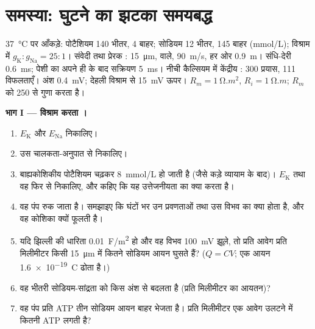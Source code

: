 \section{समस्या: घुटने का झटका समयबद्ध}

\begin{problem}
\label{pb:b2:neurons-synapses:1}
\qty{37}{\celsius} पर आँकड़े: पोटैशियम 140 भीतर, 4 बाहर; सोडियम 12 भीतर,
145 बाहर (\unit{mmol/L}); विश्राम में $g_{\mathrm K} : g_{\mathrm{Na}} = 25 : 1$।
संवेदी तथा प्रेरक : \qty{15}{\micro m},  वाले,
\qty{90}{m/s}, हर ओर \qty{0.9}{m}। संधि-देरी \qty{0.6}{ms};
पेशी का अपने ही  के बाद सक्रियण \qty{5}{ms}।
नीची कैल्सियम में केंद्रीय : 300 प्रयास, 111 विफलताएँ। अंश
\qty{0.4}{mV}; देहली विश्राम से \qty{15}{mV} ऊपर। $R_m =
\qty{1}{\ohm.m^2}$, $R_i = \qty{1}{\ohm.m}$;  $R_m$ को
250 से गुणा करता है।

\medskip
\noindent\textbf{भाग I --- विश्राम करता ।}
\begin{enumerate}
  \item $E_{\mathrm K}$ और $E_{\mathrm{Na}}$ निकालिए।
  \item उस चालकता-अनुपात से  निकालिए।
  \item बाह्यकोशिकीय पोटैशियम चढ़कर \qty{8}{mmol/L} हो जाती है (जैसे
        कड़े व्यायाम के बाद)। $E_{\mathrm K}$ तथा वह
         फिर से निकालिए, और कहिए कि यह उत्तेजनीयता का क्या करता है।
  \item वह पंप रुक जाता है। समझाइए कि घंटों भर उन प्रवणताओं तथा उस
        विभव का क्या होता है, और वह कोशिका क्यों फूलती है।
  \item यदि झिल्ली की धारिता \qty{0.01}{F/m^2} हो और वह विभव
        \qty{100}{mV} झूले, तो प्रति आवेग प्रति मिलीमीटर किसी
        \qty{15}{\micro m}  में कितने सोडियम आयन घुसते हैं?
        ($Q = CV$; एक आयन \qty{1.6e-19}{C} ढोता है।)
  \item वह भीतरी सोडियम-सांद्रता को किस अंश से
        बदलता है (प्रति मिलीमीटर  का आयतन)?
  \item वह पंप प्रति ATP तीन सोडियम आयन बाहर भेजता है। प्रति मिलीमीटर 
        एक आवेग उलटने में कितनी ATP लगती है?
\end{enumerate}


\end{problem}
